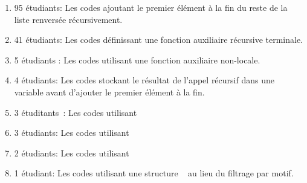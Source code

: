 \begin{enumerate}
\item 95 étudiants: Les codes ajoutant le premier élément à la fin du reste de la liste renversée récursivement.
\item 41 étudiants: Les codes définissant une fonction auxiliaire récursive terminale.
\item 5 étudiants : Les codes utilisant une fonction auxiliaire non-locale.
\item 4 étudiants: Les codes stockant le résultat de l'appel récursif dans une variable avant d'ajouter le premier élément à la fin.
\item 3 étuditants : Les codes utilisant ~
\item 3 étudiants: Les codes utilisant ~
\item 2 étudiants: Les codes utilisant ~
\item 1 étudiant: Les codes utilisant une structure ~ au lieu du filtrage par motif.
\end{enumerate}